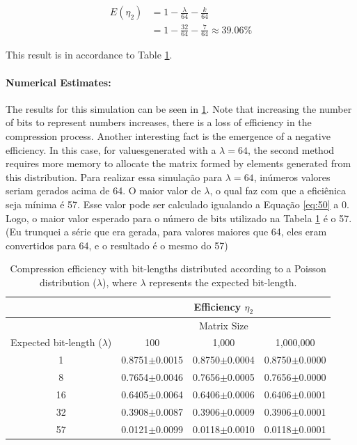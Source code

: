 \documentclass[10pt]{article}
\begin{document}
\begin{align}
 E(\eta_2) &= 1 - \frac{\lambda}{64} - \frac{k}{64} \label{eq:49} \\
 &= 1 - \frac{32}{64} - \frac{7}{64} \approx 39.06\% \label{eq:50}
\end{align}

This result is in accordance to Table \ref{tab:05}.
\paragraph{Numerical Estimates:}
The results for this simulation can be seen in \ref{tab:05}. Note that increasing the number of bits to represent numbers increases, there is a loss of efficiency in the compression process. Another interesting fact is the emergence of a negative efficiency. In this case, for values ​​generated with a $\lambda=64$, the second method requires more memory to allocate the matrix formed by elements generated from this distribution. Para realizar essa simulação para $\lambda=64$, inúmeros valores seriam gerados acima de 64. O maior valor de $\lambda$, o qual faz com que a eficiênica seja mínima é 57. Esse valor pode ser calculado igualando a Equação \ref{eq:50} a 0. Logo, o maior valor esperado para o número de bits utilizado na Tabela \ref{tab:05} é o 57. (Eu trunquei a série que era gerada, para valores maiores que 64, eles eram convertidos para 64, e o resultado é o mesmo do 57)

 \begin{table}[h]
   \centering
   \caption{Compression efficiency with bit-lengths distributed according to a Poisson distribution ($\lambda$), where $\lambda$ represents the expected bit-length.}
  \begin{tabular}{cccc}
      \hline
      &&Efficiency $\eta_2$      & \\
      \hline
      &&Matrix Size& \\
      Expected bit-length ($\lambda$)	& 100	& 1,000		    & 1,000,000 \\
      \hline
      1 	& 0.8751$\pm$0.0015 	& 0.8750$\pm$0.0004 & 0.8750$\pm$0.0000 \\ 
      8 	& 0.7654$\pm$0.0046 	& 0.7656$\pm$0.0005 & 0.7656$\pm$0.0000 \\ 
      16 	& 0.6405$\pm$0.0064 	& 0.6406$\pm$0.0006 & 0.6406$\pm$0.0001 \\ 
      32 	& 0.3908$\pm$0.0087 	& 0.3906$\pm$0.0009 & 0.3906$\pm$0.0001 \\ 
      57 	& 0.0121$\pm$0.0099 	& 0.0118$\pm$0.0010 & 0.0118$\pm$0.0001 \\
      \hline
  \end{tabular}
  \label{tab:05}
 \end{table}
\end{document}
